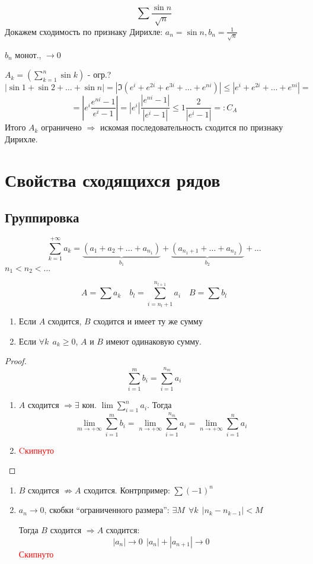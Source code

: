 \begin{example}
    $$\sum \frac{\sin n}{\sqrt n}$$
    Докажем сходимость по признаку Дирихле:
    $a_n = \sin n, b_n=\frac{1}{\sqrt n}$

    $b_n$ монот., $\to0$

    $A_k=\left(\sum\limits_{k=1}^n \sin k\right)$ - огр.?
    $$|\sin 1 + \sin 2 + \ldots + \sin n| = |\Im(e^i+e^{2i}+e^{3i}+\ldots+e^{ni})| \le |e^i+e^{2i}+\ldots+e^{ni}|=$$
    $$=\left|e^i\frac{e^{ni}-1}{e^i-1}\right|=|e^i|\frac{|e^{ni}-1|}{|e^i-1|}\le 1\frac{2}{|e^i-1|} =: C_A$$
    Итого $A_k$ ограничено $\Rightarrow$ искомая последовательность сходится по признаку Дирихле.
\end{example}

\section*{Свойства сходящихся рядов}

\subsection{Группировка}

$$\sum_{k=1}^{+\infty} a_k = \underbrace{(a_1 + a_2 + \ldots + a_{n_1})}_{b_1} + \underbrace{(a_{n_1+1} + \ldots + a_{n_2})}_{b_2} + \ldots$$
$n_1<n_2<\ldots$
\begin{theorem}
    $$A=\sum a_k \quad b_l = \sum_{i=n_l+1}^{n_{l+1}}a_i \quad B=\sum b_l$$
    \begin{enumerate}
        \item Если $A$ сходится, $B$ сходится и имеет ту же сумму
        \item Если $\forall k \ \ a_k \ge 0$, $A$ и $B$ имеют одинаковую сумму.
    \end{enumerate}
\end{theorem}
\begin{proof}
    $$\sum_{i=1}^m b_i = \sum_{i=1}^{n_m} a_i$$
    \begin{enumerate}
        \item $A$ сходится $\Rightarrow \exists$ кон. $\lim \sum\limits_{i=1}^n a_i$. Тогда $$\lim_{m\to+\infty} \sum_{i=1}^m b_i=\lim_{n\to+\infty} \sum_{i=1}^{n_m} a_i=\lim_{n\to+\infty}  \sum_{i=1}^{n} a_i$$
        \item \textcolor{red}{Cкипнуто}
    \end{enumerate}
\end{proof}
\begin{remark}
    \begin{enumerate}
        \item $B$ сходится $\not\Rightarrow A$ сходится. Контрпример: $\sum(-1)^n$
        \item $a_n\to0$, скобки ``ограниченного размера'': $\exists M \ \ \forall k \ \ |n_k-n_{k-1}|<M$
        
        Тогда $B$ сходится $\Rightarrow A$ сходится:
        $$|a_n|\to0 \ \ |a_n|+|a_{n+1}|\to0 $$
        \textcolor{red}{Скипнуто}
    \end{enumerate}
\end{remark}

